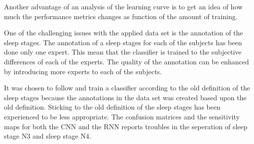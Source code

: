 Another advantage of an analysis of the learning curve is to get an idea of how much the performance metrics changes as function of the amount of training. 

One of the challenging issues with the applied data set is the annotation of the sleep stages. The annotation of a sleep stages for each of the subjects has been done only one expert. This mean that the classifier is trained to the subjective differences of each of the experts. The quality of the annotation can be enhanced by introducing more experts to each of the subjects.

It was chosen to follow and train a classifier according to the old definition of the sleep stages because the annotations in the data set was created based upon the old definition. Sticking to the old definition of the sleep stages has been experienced to be less appropriate. The confusion matrices and the sensitivity maps for both the CNN and the RNN reports troubles in the seperation of sleep stage N3 and sleep stage N4. 
